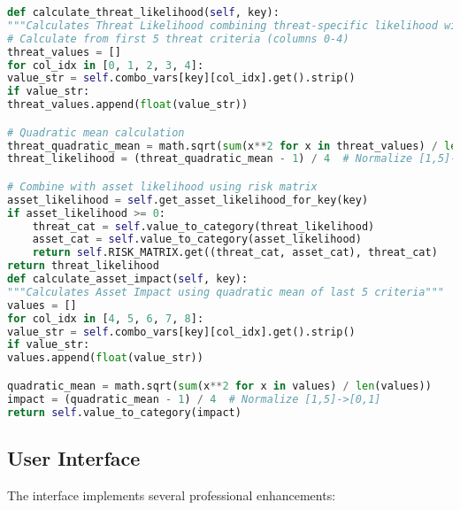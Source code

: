 \documentclass[binding=0.6cm]{sapthesis}
\begin{document}
\begin{lstlisting}[language=Python, caption=Core Risk Calculation Methods]
def calculate_threat_likelihood(self, key):
"""Calculates Threat Likelihood combining threat-specific likelihood with asset likelihood"""
# Calculate from first 5 threat criteria (columns 0-4)
threat_values = []
for col_idx in [0, 1, 2, 3, 4]:
value_str = self.combo_vars[key][col_idx].get().strip()
if value_str:
threat_values.append(float(value_str))

# Quadratic mean calculation
threat_quadratic_mean = math.sqrt(sum(x**2 for x in threat_values) / len(threat_values))
threat_likelihood = (threat_quadratic_mean - 1) / 4  # Normalize [1,5]->[0,1]

# Combine with asset likelihood using risk matrix
asset_likelihood = self.get_asset_likelihood_for_key(key)
if asset_likelihood >= 0:
    threat_cat = self.value_to_category(threat_likelihood)
    asset_cat = self.value_to_category(asset_likelihood)
    return self.RISK_MATRIX.get((threat_cat, asset_cat), threat_cat)
return threat_likelihood
def calculate_asset_impact(self, key):
"""Calculates Asset Impact using quadratic mean of last 5 criteria"""
values = []
for col_idx in [4, 5, 6, 7, 8]:
value_str = self.combo_vars[key][col_idx].get().strip()
if value_str:
values.append(float(value_str))

quadratic_mean = math.sqrt(sum(x**2 for x in values) / len(values))
impact = (quadratic_mean - 1) / 4  # Normalize [1,5]->[0,1]
return self.value_to_category(impact)
\end{lstlisting}

\subsection{User Interface}

The interface implements several professional enhancements:
\end{document}
